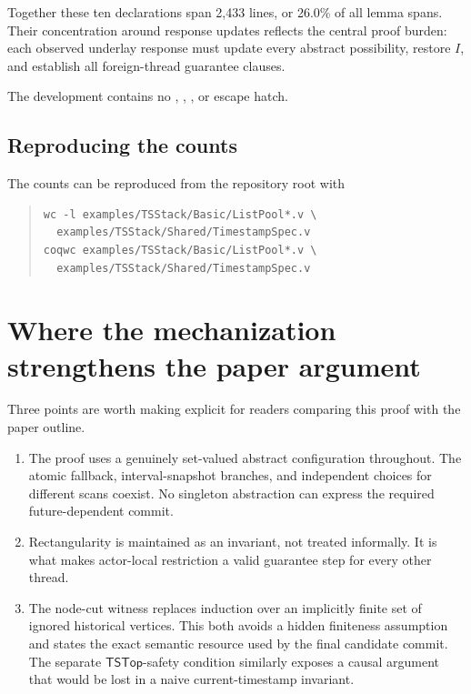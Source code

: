 \documentclass[11pt]{article}
\theoremstyle{definition}
\theoremstyle{remark}
\newcommand{\topts}{\mathsf{TSTop}}
\newcommand{\code}[1]{\texttt{\detokenize{#1}}}
\begin{document}
Together these ten declarations span 2,433 lines, or 26.0\% of all lemma
spans.  Their concentration around response updates reflects the central proof
burden: each observed underlay response must update every abstract possibility,
restore \(I\), and establish all foreign-thread guarantee clauses.

The development contains no \code{Admitted}, \code{admit}, \code{Axiom}, or
\code{Abort} escape hatch.

\subsection{Reproducing the counts}

The counts can be reproduced from the repository root with
\begin{quote}
\small
\begin{verbatim}
wc -l examples/TSStack/Basic/ListPool*.v \
  examples/TSStack/Shared/TimestampSpec.v
coqwc examples/TSStack/Basic/ListPool*.v \
  examples/TSStack/Shared/TimestampSpec.v
\end{verbatim}
\end{quote}

\section{Where the mechanization strengthens the paper argument}

Three points are worth making explicit for readers comparing this proof with
the paper outline.

\begin{enumerate}
\item The proof uses a genuinely set-valued abstract configuration throughout.
The atomic fallback, interval-snapshot branches, and independent choices for
different scans coexist.  No singleton abstraction can express the required
future-dependent commit.

\item Rectangularity is maintained as an invariant, not treated informally.
It is what makes actor-local restriction a valid guarantee step for every
other thread.

\item The node-cut witness replaces induction over an implicitly finite set of
ignored historical vertices.  This both avoids a hidden finiteness assumption
and states the exact semantic resource used by the final candidate commit.
The separate \(\topts\)-safety condition similarly exposes a causal argument
that would be lost in a naive current-timestamp invariant.
\end{enumerate}
\end{document}
